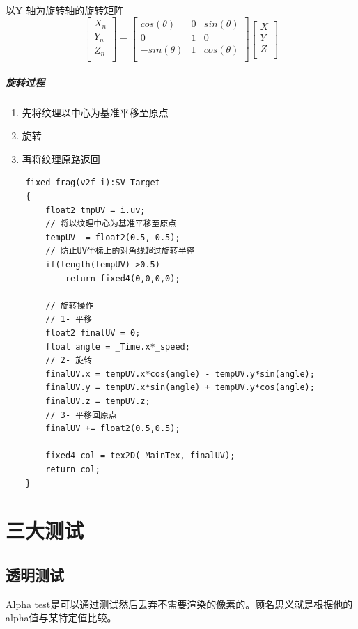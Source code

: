 \documentclass[UTF8,a4paper,12pt]{ctexbook}
\begin{document}
			以Y 轴为旋转轴的旋转矩阵
				$$
				\left[
				\begin{array}{c}
				X_n\\
				Y_n\\
				Z_n\\		
				\end{array}
				\right]	
				= \left[
				\begin{array}{ccc}
				cos(\theta) & 0 & sin(\theta)\\
				0 & 1 & 0\\
				-sin(\theta) & 1 & cos(\theta)\\
				\end{array}
				\right]
				\left[
				\begin{array}{c}
				X\\
				Y\\
				Z\\		
				\end{array}
				\right]	
				$$		

		\subparagraph{旋转过程}
			\begin{enumerate}
				\item 先将纹理以中心为基准平移至原点
				\item 旋转
				\item 再将纹理原路返回
			\end{enumerate}	 	

			\begin{lstlisting}
	fixed frag(v2f i):SV_Target
	{
		float2 tmpUV = i.uv;
		// 将以纹理中心为基准平移至原点
		tempUV -= float2(0.5, 0.5);
		// 防止UV坐标上的对角线超过旋转半径
		if(length(tempUV) >0.5)
			return fixed4(0,0,0,0);
		
		// 旋转操作
		// 1- 平移
		float2 finalUV = 0;
		float angle = _Time.x*_speed;
		// 2- 旋转
		finalUV.x = tempUV.x*cos(angle) - tempUV.y*sin(angle);
		finalUV.y = tempUV.x*sin(angle) + tempUV.y*cos(angle);
		finalUV.z = tempUV.z;
		// 3- 平移回原点
		finalUV += float2(0.5,0.5);
		
		fixed4 col = tex2D(_MainTex, finalUV);
		return col;
	}
				\end{lstlisting}
	
	\section{三大测试}
		\subsection{透明测试}
			Alpha test是可以通过测试然后丢弃不需要渲染的像素的。顾名思义就是根据他的alpha值与某特定值比较。
			
\end{document}
